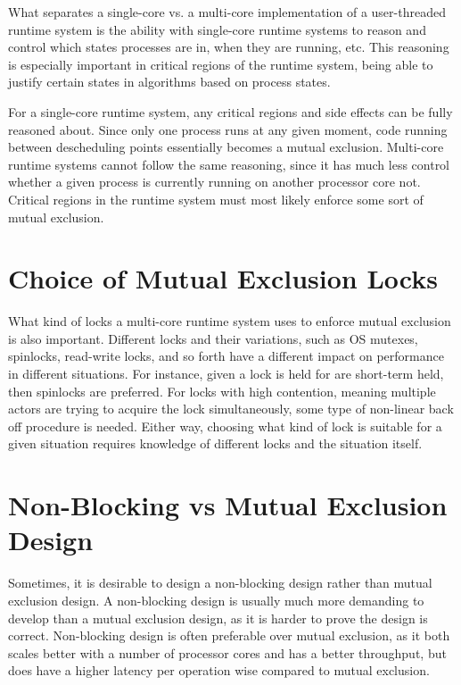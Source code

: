What separates a single\hyp{}core vs. a multi\hyp{}core implementation of a user\hyp{}threaded runtime system is the ability with single\hyp{}core runtime systems to reason and control which states processes are in, when they are running, etc. This reasoning is especially important in critical regions of the runtime system, being able to justify certain states in algorithms based on process states.

For a single\hyp{}core runtime system, any critical regions and side effects can be fully reasoned about. Since only one process runs at any given moment, code running between descheduling points essentially becomes a mutual exclusion. Multi\hyp{}core runtime systems cannot follow the same reasoning, since it has much less control whether a given process is currently running on another processor core not. Critical regions in the runtime system must most likely enforce some sort of mutual exclusion. 


\section{Choice of Mutual Exclusion Locks}


What kind of locks a multi\hyp{}core runtime system uses to enforce mutual exclusion is also important. Different locks and their variations, such as OS mutexes, spinlocks, read\hyp{}write locks, and so forth have a different impact on performance in different situations. For instance, given a lock is held for are short\hyp{}term held, then spinlocks are preferred. For locks with high contention, meaning multiple actors are trying to acquire the lock simultaneously, some type of non\hyp{}linear back off procedure is needed. Either way, choosing what kind of lock is suitable for a given situation requires knowledge of different locks and the situation itself.


\section{Non\hyp{}Blocking vs Mutual Exclusion Design}


Sometimes, it is desirable to design a non\hyp{}blocking design rather than mutual exclusion design. A non\hyp{}blocking design is usually much more demanding to develop than a mutual exclusion design, as it is harder to prove the design is correct. Non\hyp{}blocking design is often preferable over mutual exclusion, as it both scales better with a number of processor cores and has a better throughput, but does have a higher latency per operation wise compared to mutual exclusion.


